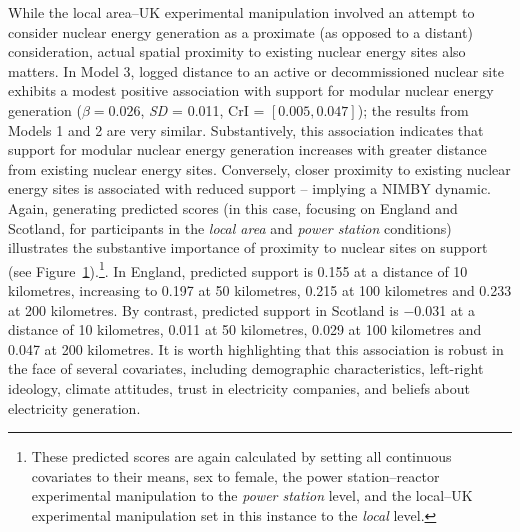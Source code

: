 \documentclass[a4paper, 11pt]{article}
\begin{document}
While the local area--UK experimental manipulation involved an attempt to consider nuclear energy generation as a proximate (as opposed to a distant) consideration, actual spatial proximity to existing nuclear energy sites also matters. In Model 3, logged distance to an active or decommissioned nuclear site exhibits a modest positive association with support for modular nuclear energy generation ($\beta = 0.026$, \emph{SD} = 0.011, CrI = $[0.005, 0.047]$); the results from Models 1 and 2 are very similar. Substantively, this association indicates that support for modular nuclear energy generation increases with greater distance from existing nuclear energy sites. Conversely, closer proximity to existing nuclear energy sites is associated with reduced support -- implying a NIMBY dynamic. Again, generating predicted scores (in this case, focusing on England and Scotland, for participants in the \emph{local area} and \emph{power station} conditions) illustrates the substantive importance of proximity to nuclear sites on support (see Figure~\ref{fig:pred-distance}).\footnote{These predicted scores are again calculated by setting all continuous covariates to their means, sex to female, the power station--reactor experimental manipulation to the \emph{power station} level, and the local--UK experimental manipulation set in this instance to the \emph{local} level.}. In England, predicted support is 0.155 at a distance of 10 kilometres, increasing to 0.197 at 50 kilometres, 0.215 at 100 kilometres and 0.233 at 200 kilometres. By contrast, predicted support in Scotland is $-$0.031 at a distance of 10 kilometres, 0.011 at 50 kilometres, 0.029 at 100 kilometres and 0.047 at 200 kilometres. It is worth highlighting that this association is robust in the face of several covariates, including demographic characteristics, left-right ideology, climate attitudes, trust in electricity companies, and beliefs about electricity generation.

\begin{figure}
    \centering
    \label{fig:pred-distance}
\end{figure}
\end{document}
